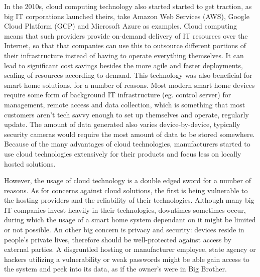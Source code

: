 In the 2010s, cloud computing technology also started started to get traction, as big IT corporations launched theirs, take Amazon Web Services (AWS), Google Cloud Platform (GCP) and Microsoft Azure as examples. Cloud computing means that such providers provide on-demand delivery of IT resources over the Internet, so that that companies can use this to outsource different portions of their infrastructure instead of having to operate everything themselves. \cite{AWScloud} It can lead to significant cost savings besides the more agile and faster deployments, scaling of resources according to demand. This technology was also beneficial for smart home solutions, for a number of reasons. \cite{ChakSHS} Most modern smart home devices require some form of background IT infrastructure (eg. control server) for management, remote access and data collection, which is something that most customers aren't tech savvy enough to set up themselves and operate, regularly update. The amount of data generated also varies device-by-device, typically security cameras would require the most amount of data to be stored somewhere. Because of the many advantages of cloud technologies, manufacturers started to use cloud technologies extensively for their products and focus less on locally hosted solutions.

However, the usage of cloud technology is a double edged sword for a number of reasons. As for concerns against cloud solutions, the first is being vulnerable to the hosting providers and the reliability of their technologies. Although many big IT companies invest heavily in their technologies, downtimes sometimes occur, during which the usage of a smart home system dependant on it might be limited or not possible. An other big concern is privacy and security: devices reside in people's private lives, therefore should be well-protected against access by external parties. A disgruntled hosting or manufacturer employee, state agency or hackers utilizing a vulnerability or weak passwords might be able gain access to the system and peek into its data, as if the owner's were in Big Brother. \cite{QACloudDisadvantages} %

